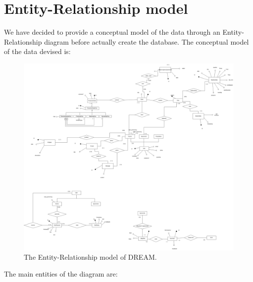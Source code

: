 \documentclass{article}
\begin{document}
\section{Entity-Relationship model}
We have decided to provide a conceptual model of the data through an Entity-Relationship diagram before actually create the database. The conceptual model of the data devised is:
\begin{figure}[H]
    \centering
    \includegraphics[scale=0.2]{er.png}
    \caption{The Entity-Relationship model of DREAM.}
    \label{fig:e-r}
\end{figure}
The main entities of the diagram are:
\end{document}
